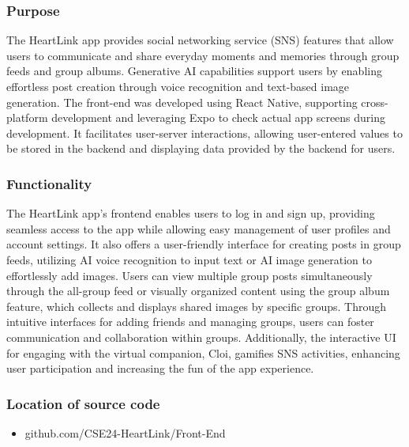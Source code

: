 \documentclass[conference]{IEEEtran}
\begin{document}
        \subsubsection{Purpose}
            The HeartLink app provides social networking service (SNS) features that allow users to communicate and share everyday moments and memories through group feeds and group albums. Generative AI capabilities support users by enabling effortless post creation through voice recognition and text-based image generation. The front-end was developed using React Native, supporting cross-platform development and leveraging Expo to check actual app screens during development. It facilitates user-server interactions, allowing user-entered values to be stored in the backend and displaying data provided by the backend for users.\\
            \vspace{3mm}
        \subsubsection{Functionality}
            The HeartLink app's frontend enables users to log in and sign up, providing seamless access to the app while allowing easy management of user profiles and account settings. It also offers a user-friendly interface for creating posts in group feeds, utilizing AI voice recognition to input text or AI image generation to effortlessly add images. Users can view multiple group posts simultaneously through the all-group feed or visually organized content using the group album feature, which collects and displays shared images by specific groups. Through intuitive interfaces for adding friends and managing groups, users can foster communication and collaboration within groups. Additionally, the interactive UI for engaging with the virtual companion, Cloi, gamifies SNS activities, enhancing user participation and increasing the fun of the app experience.\\
            \vspace{3mm}
        \subsubsection{Location of source code}
            \begin{itemize}
                \item github.com/CSE24-HeartLink/Front-End\\
            \end{itemize}
            
\end{document}
